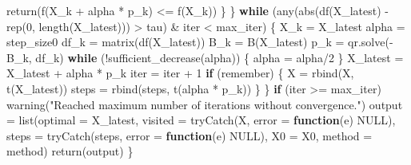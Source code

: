 \documentclass[
]{book}
\newenvironment{Shaded}{\begin{snugshade}}{\end{snugshade}}
\newcommand{\AttributeTok}[1]{\textcolor[rgb]{0.77,0.63,0.00}{#1}}
\newcommand{\ConstantTok}[1]{\textcolor[rgb]{0.00,0.00,0.00}{#1}}
\newcommand{\ControlFlowTok}[1]{\textcolor[rgb]{0.13,0.29,0.53}{\textbf{#1}}}
\newcommand{\DecValTok}[1]{\textcolor[rgb]{0.00,0.00,0.81}{#1}}
\newcommand{\FunctionTok}[1]{\textcolor[rgb]{0.00,0.00,0.00}{#1}}
\newcommand{\NormalTok}[1]{#1}
\newcommand{\OtherTok}[1]{\textcolor[rgb]{0.56,0.35,0.01}{#1}}
\newcommand{\SpecialCharTok}[1]{\textcolor[rgb]{0.00,0.00,0.00}{#1}}
\newcommand{\StringTok}[1]{\textcolor[rgb]{0.31,0.60,0.02}{#1}}
\begin{document}
\begin{Shaded}
\begin{Highlighting}[]
            \FunctionTok{return}\NormalTok{(}\FunctionTok{f}\NormalTok{(X\_k }\SpecialCharTok{+}\NormalTok{ alpha }\SpecialCharTok{*}\NormalTok{ p\_k) }\SpecialCharTok{\textless{}=} \FunctionTok{f}\NormalTok{(X\_k))}
\NormalTok{        \}}
\NormalTok{    \}}
    \ControlFlowTok{while}\NormalTok{ (}\FunctionTok{any}\NormalTok{(}\FunctionTok{abs}\NormalTok{(}\FunctionTok{df}\NormalTok{(X\_latest) }\SpecialCharTok{{-}} \FunctionTok{rep}\NormalTok{(}\DecValTok{0}\NormalTok{, }\FunctionTok{length}\NormalTok{(X\_latest))) }\SpecialCharTok{\textgreater{}}\NormalTok{ tau) }\SpecialCharTok{\&}\NormalTok{ iter }\SpecialCharTok{\textless{}}\NormalTok{ max\_iter) \{}
\NormalTok{        X\_k }\OtherTok{=}\NormalTok{ X\_latest}
\NormalTok{        alpha }\OtherTok{=}\NormalTok{ step\_size0}
\NormalTok{        df\_k }\OtherTok{=} \FunctionTok{matrix}\NormalTok{(}\FunctionTok{df}\NormalTok{(X\_latest))}
\NormalTok{        B\_k }\OtherTok{=} \FunctionTok{B}\NormalTok{(X\_latest)}
\NormalTok{        p\_k }\OtherTok{=} \FunctionTok{qr.solve}\NormalTok{(}\SpecialCharTok{{-}}\NormalTok{B\_k, df\_k)}
        \ControlFlowTok{while}\NormalTok{ (}\SpecialCharTok{!}\FunctionTok{sufficient\_decrease}\NormalTok{(alpha)) \{}
\NormalTok{            alpha }\OtherTok{=}\NormalTok{ alpha}\SpecialCharTok{/}\DecValTok{2}
\NormalTok{        \}}
\NormalTok{        X\_latest }\OtherTok{=}\NormalTok{ X\_latest }\SpecialCharTok{+}\NormalTok{ alpha }\SpecialCharTok{*}\NormalTok{ p\_k}
\NormalTok{        iter }\OtherTok{=}\NormalTok{ iter }\SpecialCharTok{+} \DecValTok{1}
        \ControlFlowTok{if}\NormalTok{ (remember) \{}
\NormalTok{            X }\OtherTok{=} \FunctionTok{rbind}\NormalTok{(X, }\FunctionTok{t}\NormalTok{(X\_latest))}
\NormalTok{            steps }\OtherTok{=} \FunctionTok{rbind}\NormalTok{(steps, }\FunctionTok{t}\NormalTok{(alpha }\SpecialCharTok{*}\NormalTok{ p\_k))}
\NormalTok{        \}}
\NormalTok{    \}}
    \ControlFlowTok{if}\NormalTok{ (iter }\SpecialCharTok{\textgreater{}=}\NormalTok{ max\_iter) }
        \FunctionTok{warning}\NormalTok{(}\StringTok{"Reached maximum number of iterations without convergence."}\NormalTok{)}
\NormalTok{    output }\OtherTok{=} \FunctionTok{list}\NormalTok{(}\AttributeTok{optimal =}\NormalTok{ X\_latest, }\AttributeTok{visited =} \FunctionTok{tryCatch}\NormalTok{(X, }\AttributeTok{error =} \ControlFlowTok{function}\NormalTok{(e) }\ConstantTok{NULL}\NormalTok{), }\AttributeTok{steps =} \FunctionTok{tryCatch}\NormalTok{(steps, }\AttributeTok{error =} \ControlFlowTok{function}\NormalTok{(e) }\ConstantTok{NULL}\NormalTok{), }\AttributeTok{X0 =}\NormalTok{ X0, }\AttributeTok{method =}\NormalTok{ method)}
    \FunctionTok{return}\NormalTok{(output)}
\NormalTok{\}}
\end{Highlighting}
\end{Shaded}
\end{document}
